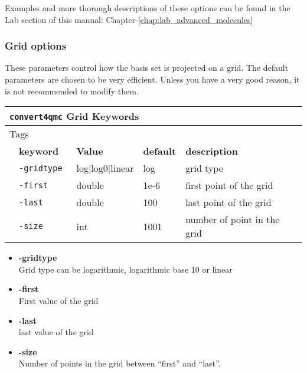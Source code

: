 Examples and more thorough descriptions of these options can be found in the Lab section of this manual: Chapter-\ref{chap:lab_advanced_molecules}\\

\subsubsection{Grid options}
                                          
% 
These parameters control how the basis set is projected on a grid. The default parameters are chosen to be very efficient. Unless you have a very good reason, it is not recommended to modify them. 

\begin{table}[h]
 \begin{center}
 \begin{tabularx}{\textwidth}{l l l l l }
 \hline
 \multicolumn{5}{l}{\texttt{convert4qmc} Grid Keywords} \\
 \hline
 \multicolumn{2}{l}{Tags}  & \multicolumn{3}{l}{}\\
    &   \bfseries keyword      & \bfseries Value & \bfseries default   & \bfseries description \\
    &   \texttt{-gridtype    } &  log|log0|linear      &  log & grid type  \\
    &   \texttt{-first         } & double  &  1e-6 & first point of the grid   \\
    &   \texttt{-last       } & double  & 100 & last point of the grid \\
    &   \texttt{-size      } &  int    &  1001& number of point in the grid   \\
     \hline
     \end{tabularx}
 \end{center}
 \end{table}
\begin{itemize}
\item \textbf{-gridtype}\\
Grid type can be logarithmic, logarithmic base 10 or linear \\
\item \textbf{-first}\\
First value of the grid\\
\item \textbf{-last}\\
last value of the grid\\
\item \textbf{-size}\\
Number of points in the grid between ``first'' and ``last''. \\
\end{itemize}


